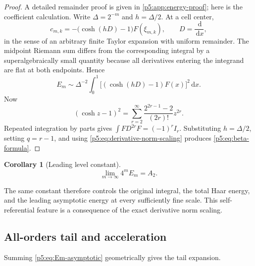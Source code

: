 \documentclass[11pt,oneside]{article}
\newtheorem{corollary}[theorem]{Corollary}
\theoremstyle{definition}
\newcommand{\dd}{\,\mathrm d}
\begin{document}
\begin{proof}
A detailed remainder proof is given in \cref{p5:app:energy-proof}; here is the
coefficient calculation.  Write $\Delta=2^{-m}$ and $h=\Delta/2$.  At a cell
center,
\[
 c_{m,k}=-\bigl(\cosh(hD)-1\bigr)F(\xi_{m,k}),
 \qquad D=\frac{\dd}{\dd x},
\]
in the sense of an arbitrary finite Taylor expansion with uniform remainder.
The midpoint Riemann sum differs from the corresponding integral by a
superalgebraically small quantity because all derivatives entering the
integrand are flat at both endpoints.  Hence
\[
 E_m\sim\Delta^{-2}\int_0^1
 \bigl[(\cosh(hD)-1)F(x)\bigr]^2\dd x.
\]
Now
\begin{equation}
 (\cosh z-1)^2
 =\sum_{r=2}^\infty
   \frac{2^{2r-1}-2}{(2r)!}z^{2r}.                       \label{p5:eq:cosh-square}
\end{equation}
Repeated integration by parts gives
$\int F D^{2r}F=(-1)^rI_r$.  Substituting
$h=\Delta/2$, setting $q=r-1$, and using
\eqref{p5:eq:derivative-norm-scaling} produces
\eqref{p5:eq:beta-formula}.
\end{proof}

\begin{corollary}[Leading level constant]
\label{p5:cor:Em-leading}
\begin{equation}
 \boxed{\displaystyle
 \lim_{m\to\infty}4^mE_m=A_2.}                           \label{p5:eq:Em-leading}
\end{equation}
\end{corollary}

The same constant therefore controls the original integral, the total Haar
energy, and the leading asymptotic energy at every sufficiently fine scale.
This self-referential feature is a consequence of the exact derivative norm
scaling.

\subsection{All-orders tail and acceleration}

Summing \eqref{p5:eq:Em-asymptotic} geometrically gives the tail expansion.
\end{document}
